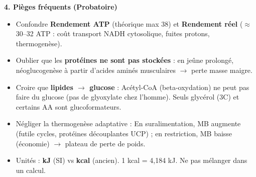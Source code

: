 \documentclass[11pt]{article}
\newcommand{\cle}[1]{{\popxbold\color{popdark}#1}}
\begin{document}
\begin{bilan}
\textbf{4. Pièges fréquents (Probatoire)}
\begin{attention}
    \begin{itemize}
        \item Confondre \textbf{Rendement ATP} (théorique max 38) et \textbf{Rendement réel} ($\approx$ 30--32 ATP : coût transport NADH cytosolique, fuites protons, thermogenèse).
        \item Oublier que les \textbf{protéines ne sont pas stockées} : en jeûne prolongé, néoglucogenèse à partir d'acides aminés musculaires $\rightarrow$ perte masse maigre.
        \item Croire que \textbf{lipides $\rightarrow$ glucose} : Acétyl-CoA (beta-oxydation) ne peut pas faire du glucose (pas de glyoxylate chez l'homme). Seuls glycérol (3C) et certains AA sont glucoformateurs.
        \item Négliger la \cle{thermogenèse adaptative} : En suralimentation, MB augmente (futile cycles, protéines découplantes UCP) ; en restriction, MB baisse (économie) $\rightarrow$ plateau de perte de poids.
        \item Unités : \textbf{kJ} (SI) vs \textbf{kcal} (ancien). 1 kcal = 4,184 kJ. Ne pas mélanger dans un calcul.
    \end{itemize}
\end{attention}
\end{bilan}
\end{document}
